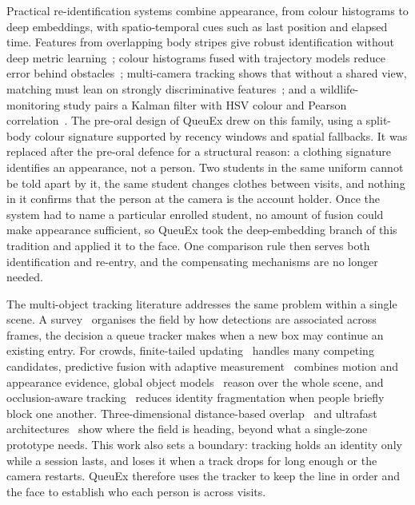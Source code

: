 \documentclass{research}
\newcommand{\sysname}{QueuEx}
\begin{document}
Practical re-identification systems combine appearance, from colour
histograms to deep embeddings, with spatio-temporal cues such as last
position and elapsed time. Features from overlapping body stripes give
robust identification without deep metric
learning~\cite{rrlcomp078personidentificationdiscriminative}; colour
histograms fused with trajectory models reduce error behind
obstacles~\cite{rrlcomp058fusingappearancespatio}; multi-camera tracking
shows that without a shared view, matching must lean on strongly
discriminative features~\cite{rrlcomp073unveilingpersonnelmovement}; and
a wildlife-monitoring study pairs a Kalman filter with HSV colour and
Pearson correlation~\cite{rrlcomp077smartwildlifemonitoring}. The
pre-oral design of \sysname{} drew on this family, using a split-body
colour signature supported by recency windows and spatial fallbacks. It
was replaced after the pre-oral defence for a structural reason: a
clothing signature identifies an appearance, not a person. Two students
in the same uniform cannot be told apart by it, the same student changes
clothes between visits, and nothing in it confirms that the person at
the camera is the account holder. Once the system had to name a
particular enrolled student, no amount of fusion could make appearance
sufficient, so \sysname{} took the deep-embedding branch of this
tradition and applied it to the face. One comparison rule then serves
both identification and re-entry, and the compensating mechanisms are no
longer needed.

The multi-object tracking literature addresses the same problem within a
single scene. A survey~\cite{rrlcomp005deeplearningmulti} organises the
field by how detections are associated across frames, the decision a
queue tracker makes when a new box may continue an existing entry. For
crowds, finite-tailed updating~\cite{rrlcomp048effectivelyfinitetailed}
handles many competing candidates, predictive fusion with adaptive
measurement~\cite{rrlcomp049multiobjecttracking} combines motion and
appearance evidence, global object
models~\cite{rrlcomp072effectivemultiobject} reason over the whole
scene, and occlusion-aware
tracking~\cite{rrlcomp057dettrackalgorithmmultiple} reduces identity
fragmentation when people briefly block one another. Three-dimensional
distance-based overlap~\cite{rrlcomp076dioudistanceintersection} and
ultrafast architectures~\cite{rrlcomp097activemultiobject} show where the
field is heading, beyond what a single-zone prototype needs. This work
also sets a boundary: tracking holds an identity only while a session
lasts, and loses it when a track drops for long enough or the camera
restarts. \sysname{} therefore uses the tracker to keep the line in
order and the face to establish who each person is across visits.
\end{document}
